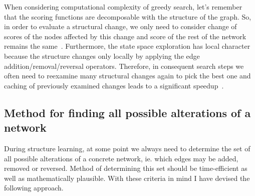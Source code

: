 \documentclass[english,cover]{fitthesis} %
\begin{document}
When considering computational complexity of greedy search, let's remember that the scoring functions are decomposable with the structure of the graph. So, in order to evaluate a structural change, we only need to consider change of scores of the nodes affected by this change and score of the rest of the network remains the same~\cite[p.~818]{pgm}. Furthermore, the state space exploration has local character because the structure changes only locally by applying the edge addition/removal/reversal operators. Therefore, in consequent search steps we often need to reexamine many structural changes again to pick the best one and caching of previously examined changes leads to a significant speedup~\cite[p.~819]{pgm}.

\subsection{Method for finding all possible alterations of a network}
During structure learning, at some point we always need to determine the set of all possible alterations of a concrete network, ie. which edges may be added, removed or reversed. Method of determining this set should be time-efficient as well as mathematically plausible. With these criteria in mind I have devised the following approach.
\end{document}

